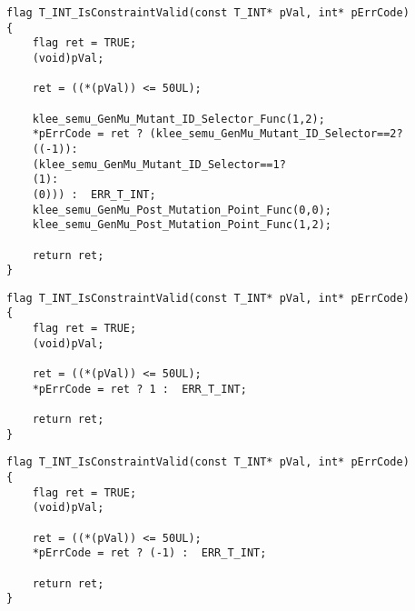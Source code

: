 
\begin{lstlisting}[style=CStyle, float=t, caption=Meta-Mutant of function T\_INT\_IsConstraintValid., label=meta_mutant_example]
flag T_INT_IsConstraintValid(const T_INT* pVal, int* pErrCode)
{
    flag ret = TRUE;
    (void)pVal;

    ret = ((*(pVal)) <= 50UL);

    klee_semu_GenMu_Mutant_ID_Selector_Func(1,2);
    *pErrCode = ret ? (klee_semu_GenMu_Mutant_ID_Selector==2?
    ((-1)):
    (klee_semu_GenMu_Mutant_ID_Selector==1?
    (1):
    (0))) :  ERR_T_INT;
    klee_semu_GenMu_Post_Mutation_Point_Func(0,0);
    klee_semu_GenMu_Post_Mutation_Point_Func(1,2);

    return ret;
}
\end{lstlisting}

\begin{lstlisting}[style=CStyle, float=t, caption=Mutant 1 of function T\_INT\_IsConstraintValid., label=meta_mutant_1]
flag T_INT_IsConstraintValid(const T_INT* pVal, int* pErrCode)
{
    flag ret = TRUE;
    (void)pVal;

    ret = ((*(pVal)) <= 50UL);
    *pErrCode = ret ? 1 :  ERR_T_INT;

    return ret;
}
\end{lstlisting}

\begin{lstlisting}[style=CStyle, float=t, caption=Mutant 2 of function T\_INT\_IsConstraintValid., label=meta_mutant_2]
flag T_INT_IsConstraintValid(const T_INT* pVal, int* pErrCode)
{
    flag ret = TRUE;
    (void)pVal;

    ret = ((*(pVal)) <= 50UL);
    *pErrCode = ret ? (-1) :  ERR_T_INT;

    return ret;
}
\end{lstlisting}